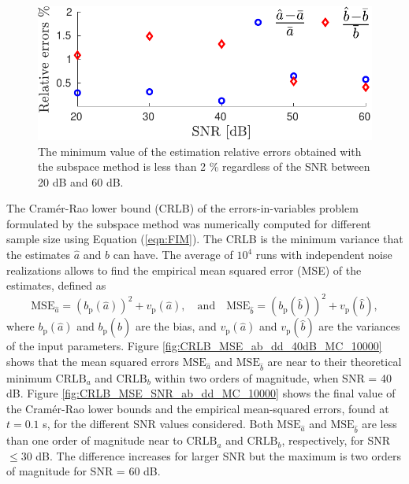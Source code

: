 \begin{figure}[!htbp]
\centering
\includegraphics[width=1\columnwidth]{./ChapterRampInput/fig/Fig_4.pdf} 
\caption{ \label{fig:rele_SNR_dd_10000} The minimum value of the estimation relative errors obtained with the subspace method is less than 2  \% regardless of the SNR between 20 dB and 60 dB. }
\end{figure}

The Cram\'er-Rao lower bound (CRLB) of the errors-in-variables problem formulated by the subspace method was numerically computed for different sample size using Equation (\ref{eqn:FIM}).
The CRLB is the minimum variance that the estimates $\widehat{a}$ and $\widehat{b}$ can have.
The average of $10^4$ runs with independent noise realizations allows to find the empirical mean squared error (MSE) of the estimates, defined as
\begin{equation} \mathrm{MSE}_{\widehat{a}} = \left(b_{\mathrm{p}}\left( \widehat{a} \right) \right)^2 + v_{\mathrm{p}} \left( \widehat{a} \right), \quad \text{and} \quad  \mathrm{MSE}_{\widehat{b}} = ( b_{\mathrm{p}} ( \widehat{b} ) )^2 + v_{\mathrm{p}} ( \widehat{b} ), \end{equation}
where $b_{\mathrm{p}} \left( \widehat{a} \right)$ and $b_{\mathrm{p}} ( \widehat{b} )$ are the bias, and $v_{\mathrm{p}} \left( \widehat{a} \right)$ and $v_{\mathrm{p}} ( \widehat{b} )$ are the variances of the input parameters.
Figure \ref{fig:CRLB_MSE_ab_dd_40dB_MC_10000} shows that the mean squared errors $\mathrm{MSE}_{\hat{a}}$ and $\mathrm{MSE}_{\hat{b}}$ are near to their theoretical minimum $\mathrm{CRLB}_{a}$ and $\mathrm{CRLB}_{b}$ within two orders of magnitude, when SNR = 40 dB.
Figure \ref{fig:CRLB_MSE_SNR_ab_dd_MC_10000} shows the final value of the Cram\'er-Rao lower bounds and the empirical mean-squared errors, found at $t=0.1$ s, for the different SNR values considered.
Both $\mathrm{MSE}_{\hat{a}}$ and $\mathrm{MSE}_{\hat{b}}$ are less than one order of magnitude near to $\mathrm{CRLB}_a$ and $\mathrm{CRLB}_{b}$, respectively, for SNR $\leq 30$ dB.
The difference increases for larger SNR but the maximum is two orders of magnitude for SNR = 60 dB.

